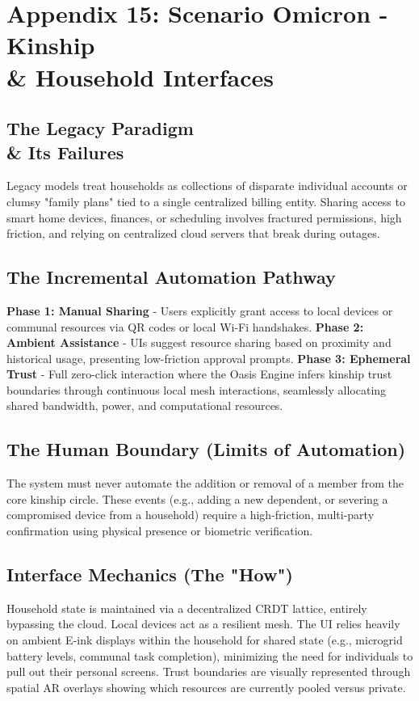 \section{Appendix 15: Scenario Omicron - Kinship \\\& Household Interfaces}

\subsection{The Legacy Paradigm \\\& Its Failures}
Legacy models treat households as collections of disparate individual accounts or clumsy "family plans" tied to a single centralized billing entity. Sharing access to smart home devices, finances, or scheduling involves fractured permissions, high friction, and relying on centralized cloud servers that break during outages.

\subsection{The Incremental Automation Pathway}
\textbf{Phase 1: Manual Sharing} - Users explicitly grant access to local devices or communal resources via QR codes or local Wi-Fi handshakes.
\textbf{Phase 2: Ambient Assistance} - UIs suggest resource sharing based on proximity and historical usage, presenting low-friction approval prompts.
\textbf{Phase 3: Ephemeral Trust} - Full zero-click interaction where the Oasis Engine infers kinship trust boundaries through continuous local mesh interactions, seamlessly allocating shared bandwidth, power, and computational resources.

\subsection{The Human Boundary (Limits of Automation)}
The system must never automate the addition or removal of a member from the core kinship circle. These events (e.g., adding a new dependent, or severing a compromised device from a household) require a high-friction, multi-party confirmation using physical presence or biometric verification.

\subsection{Interface Mechanics (The "How")}
Household state is maintained via a decentralized CRDT lattice, entirely bypassing the cloud. Local devices act as a resilient mesh. The UI relies heavily on ambient E-ink displays within the household for shared state (e.g., microgrid battery levels, communal task completion), minimizing the need for individuals to pull out their personal screens. Trust boundaries are visually represented through spatial AR overlays showing which resources are currently pooled versus private.

